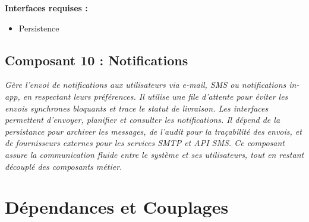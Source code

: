 \textbf{Interfaces requises :}
\begin{itemize}
\item Persistence
\end{itemize}

\subsection{Composant 10 : Notifications}

\textit{
 Gère l’envoi de notifications aux utilisateurs via e-mail, SMS ou notifications in-app, en respectant leurs préférences. Il utilise une file d’attente pour éviter les envois synchrones bloquants et trace le statut de livraison. Les interfaces permettent d’envoyer, planifier et consulter les notifications. Il dépend de la persistance pour archiver les messages, de l’audit pour la traçabilité des envois, et de fournisseurs externes pour les services SMTP et API SMS. Ce composant assure la communication fluide entre le système et ses utilisateurs, tout en restant découplé des composants métier.}

\section{Dépendances et Couplages}




